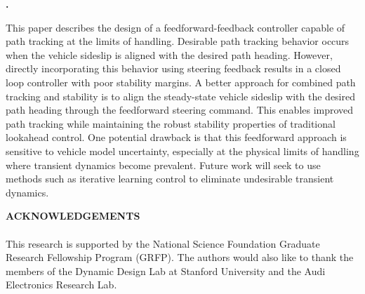 \documentclass[10pt,a4paper]{article}
\def\section#1{\refstepcounter{section} \vspace{3.5mm} \noindent
{\normalsize\bf {\thesection.}} \hspace{0.5mm}{\normalsize\bf #1} \par \vspace{2mm}}
\begin{document}
\section{CONCLUSION AND FUTURE WORK}

This paper describes the design of a feedforward-feedback controller capable of path tracking at the limits of handling. Desirable path tracking behavior occurs when the vehicle sideslip is aligned
with the desired path heading. However, directly incorporating this behavior using steering feedback results in a closed loop controller with poor stability margins. 
A better approach for combined path tracking and stability is to align the steady-state vehicle sideslip with the desired path heading through the feedforward steering command. 
This enables improved path tracking while maintaining the robust stability properties of traditional lookahead control. One potential drawback is that this feedforward approach is sensitive to vehicle model uncertainty, especially at the physical
limits of handling where transient dynamics become prevalent. Future work will seek to use methods such as iterative learning control to eliminate undesirable transient dynamics. \\

\bigskip


\bigskip
\noindent\textbf{ACKNOWLEDGEMENTS}\\
\\
This research is supported by the National Science Foundation Graduate Research Fellowship Program (GRFP). 
The authors would also like to thank the members of the Dynamic Design Lab at Stanford University and the Audi Electronics Research Lab.
\end{document}
